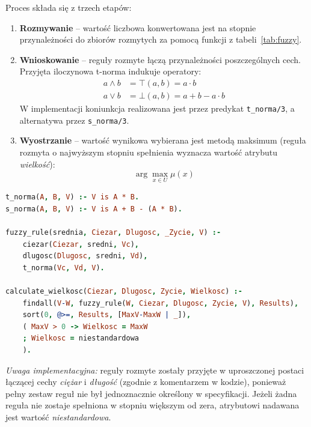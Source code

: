 \documentclass[11pt,a4paper]{article}
\newcommand{\code}[1]{\texttt{#1}}
\begin{document}
Proces składa się z trzech etapów:
\begin{enumerate}
    \item \textbf{Rozmywanie} -- wartość liczbowa konwertowana jest na stopnie
          przynależności do zbiorów rozmytych za pomocą funkcji z tabeli~\ref{tab:fuzzy}.
    \item \textbf{Wnioskowanie} -- reguły rozmyte łączą przynależności
          poszczególnych cech. Przyjęta iloczynowa t-norma indukuje operatory:
          \begin{align}
              a \wedge b &= \top(a,b) = a \cdot b \\
              a \vee b   &= \bot(a,b) = a + b - a \cdot b
          \end{align}
          W implementacji koniunkcja realizowana jest przez predykat
          \code{t\_norma/3}, a alternatywa przez \code{s\_norma/3}.
    \item \textbf{Wyostrzanie} -- wartość wynikowa wybierana jest metodą maksimum
          (reguła rozmyta o najwyższym stopniu spełnienia wyznacza wartość
          atrybutu \textit{wielkość}):
          \begin{equation}
              \arg\max_{x \in U} \mu(x)
          \end{equation}
\end{enumerate}

\begin{lstlisting}[language=Prolog,caption={Reguła rozmyta i defuzyfikacja (\code{fuzzy.pl})}]
t_norma(A, B, V) :- V is A * B.
s_norma(A, B, V) :- V is A + B - (A * B).

fuzzy_rule(srednia, Ciezar, Dlugosc, _Zycie, V) :-
    ciezar(Ciezar, sredni, Vc),
    dlugosc(Dlugosc, sredni, Vd),
    t_norma(Vc, Vd, V).

calculate_wielkosc(Ciezar, Dlugosc, Zycie, Wielkosc) :-
    findall(V-W, fuzzy_rule(W, Ciezar, Dlugosc, Zycie, V), Results),
    sort(0, @>=, Results, [MaxV-MaxW | _]),
    ( MaxV > 0 -> Wielkosc = MaxW
    ; Wielkosc = niestandardowa
    ).
\end{lstlisting}

\noindent\textit{Uwaga implementacyjna:} reguły rozmyte zostały przyjęte
w uproszczonej postaci łączącej cechy \textit{ciężar} i \textit{długość}
(zgodnie z komentarzem w kodzie), ponieważ pełny zestaw reguł nie był
jednoznacznie określony w specyfikacji. Jeżeli żadna reguła nie zostaje
spełniona w stopniu większym od zera, atrybutowi nadawana jest wartość
\textit{niestandardowa}.
\end{document}
